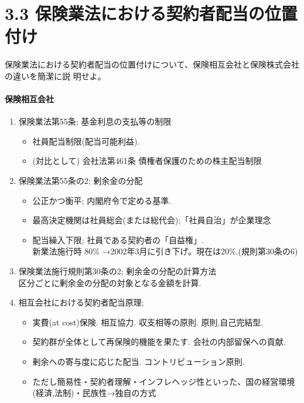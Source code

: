 \documentclass[report,gutter=10mm,fore-edge=10mm,uplatex,dvipdfmx]{jlreq}
\begin{document}
\section{3.3 保険業法における契約者配当の位置付け}
保険業法における契約者配当の位置付けについて、保険相互会社と保険株式会社の違いを簡潔に説
明せよ。
\paragraph{保険相互会社}
\begin{enumerate}
 \item 保険業法第55条; 基金利息の支払等の制限
\begin{itemize}
 \item 社員配当制限(配当可能利益). 
 \item (対比として) 会社法第461条 債権者保護のための株主配当制限
\end{itemize}
 \item 保険業法第55条の2; 剰余金の分配
\begin{itemize}
 \item 公正かつ衡平; 内閣府令で定める基準. 
 \item 最高決定機関は社員総会(または総代会);「社員自治」が企業理念
 \item 配当繰入下限; 社員である契約者の「自益権」.   \\
新業法施行時 80\% →2002年3月に引き下げ。現在は20\%.(規則第30条の6)
\end{itemize}
 \item 保険業法施行規則第30条の2; 剰余金の分配の計算方法\\
       区分ごとに剰余金の分配の対象となる金額を計算.  
 \item 相互会社における契約者配当原理;  
\begin{itemize}
 \item 実費(at cost)保険. 相互協力. 収支相等の原則. 原則,自己完結型. 
 \item 契約群が全体として再保険的機能を果たす. 会社の内部留保への貢献. 
 \item 剰余への寄与度に応じた配当. コントリビューション原則. 
 \item ただし簡易性・契約者理解・インフレヘッジ性といった、国の経営環境(経済,法制)・民族性→独自の方式
\end{itemize}
\end{enumerate}
\end{document}
